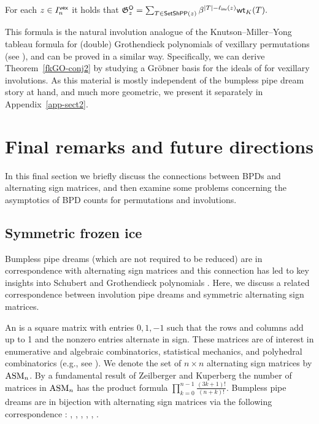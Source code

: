 \documentclass[10pt]{article}
\begin{document}
\begin{theorem}
\label{fkGO-conj2}
For each $z \in I^{\mathsf{vex}}_n $ it holds that
$\textstyle
\mathfrak{G}^{\mathsf{O}}_z = \sum_{T \in  \mathsf{SetShPP}(z) } \beta^{|T| - \ell_{\mathsf{inv}}(z)}\mathsf{wt}_K(T).
$
\end{theorem}

This formula is the natural involution analogue of 
the Knutson--Miller--Yong tableau formula for (double) Grothendieck polynomials of vexillary permutations \cite[Thm.~5.8]{KnutsonMillerYong} 
(see \cite[Thm.~7.1]{Weigandt}),
and can be proved in a similar way.
Specifically, we can derive Theorem~\ref{fkGO-conj2} by studying a Gr\"obner basis for the ideals of  for vexillary involutions. 
As this material is mostly independent of the bumpless pipe dream story at hand, and much more geometric, we present it separately in Appendix~\ref{app-sect2}.

 

\section{Final remarks and future directions}\label{final-sect}

In this final section we briefly discuss
 the connections between BPDs and alternating sign matrices, and then examine some problems concerning the asymptotics of BPD counts for permutations and involutions.

\subsection{Symmetric frozen ice}\label{ice-sect}

Bumpless pipe dreams (which are not required to be reduced) are in correspondence with alternating sign matrices \cite{L_ice,Weigandt} and this connection has led to key insights into Schubert and Grothendieck polynomials \cite{BuciumasScrimshaw,escobar2025algebrageometryasmweak,MPPY}. Here, we discuss a related correspondence between involution pipe dreams and symmetric alternating sign matrices.


An  is a square matrix with entries $0,1,-1$ such that the rows and columns add up to 1 and the nonzero entries alternate in sign. These matrices are of interest in enumerative and algebraic combinatorics, statistical mechanics, and polyhedral combinatorics (e.g., see \cite{BressoudBook}). We denote the set of $n\times n$ alternating sign matrices by $\mathrm{ASM}_n$. By a fundamental result of Zeilberger \cite{ZeilASM} and Kuperberg \cite{Kuperberg} the number of matrices in $\mathrm{ASM}_n$ has the product formula $\prod_{k=0}^{n-1} \frac{(3k+1)!}{(n+k)!}$. Bumpless pipe dreams 
are in bijection with alternating sign matrices via the following correspondence \cite{L_ice,Weigandt}:  
\be
\label{asm-eq}
\JTILE{}, \qquad \CTILE {}, \qquand \BTILE, \HTILE, \VTILE, \PTILE {}.
\ee
\end{document}

